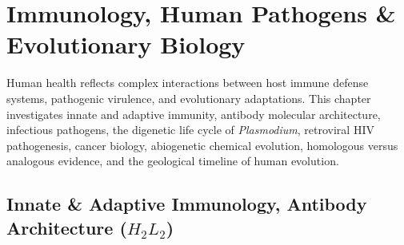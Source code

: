 \documentclass[10pt,twoside,openright]{book}
\begin{document}
\chapter{Immunology, Human Pathogens \& Evolutionary Biology}

Human health reflects complex interactions between host immune defense systems, pathogenic virulence, and evolutionary adaptations. This chapter investigates innate and adaptive immunity, antibody molecular architecture, infectious pathogens, the digenetic life cycle of \textit{Plasmodium}, retroviral HIV pathogenesis, cancer biology, abiogenetic chemical evolution, homologous versus analogous evidence, and the geological timeline of human evolution.

\section{Innate \& Adaptive Immunology, Antibody Architecture ($H_2L_2$)}
\end{document}
